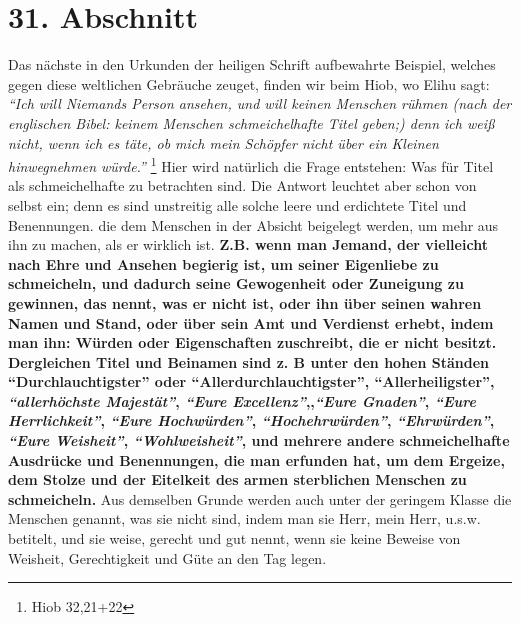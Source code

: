 \section{31. Abschnitt} \label{kap9_ab31}

Das nächste in den Urkunden der heiligen Schrift aufbewahrte Beispiel, welches
gegen diese weltlichen Gebräuche zeuget, finden wir beim Hiob, wo
Elihu sagt:
\textit{"`Ich will Niemands Person ansehen, und will keinen Menschen rühmen
(nach der
englischen Bibel: keinem Menschen schmeichelhafte Titel geben;) denn ich weiß
nicht, wenn ich es täte, ob mich mein Schöpfer nicht über ein Kleinen
hinwegnehmen würde."'}
\footnote{Hiob 32,21+22}
Hier wird natürlich die Frage
entstehen: Was für Titel als schmeichelhafte zu betrachten sind. Die Antwort
leuchtet aber schon von selbst ein; denn es sind unstreitig alle solche leere
und erdichtete Titel und Benennungen. die dem Menschen in der Absicht beigelegt
werden, um mehr aus ihn zu machen, als er wirklich ist. \textbf{Z.B. wenn man
Jemand,
der vielleicht nach Ehre und Ansehen begierig ist, um seiner
Eigenliebe zu
schmeicheln, und dadurch seine Gewogenheit oder Zuneigung zu gewinnen, das
nennt, was er nicht ist, oder ihn über seinen wahren Namen und Stand, oder über
sein Amt und Verdienst erhebt, indem man ihn: Würden oder Eigenschaften
zuschreibt, die er nicht besitzt. Dergleichen Titel und Beinamen sind z. B unter
den hohen Ständen "`Durchlauchtigster"' oder "`Allerdurchlauchtigster"',
"`Allerheiligster"', \textit{"`allerhöchste Majestät"'}, \textit{"`Eure
Excellenz"'},,\textit{"`Eure
Gnaden"'}, \textit{"`Eure Herrlichkeit"'}, \textit{"`Eure Hochwürden"'},
\textit{"`Hochehrwürden"'},
\textit{"`Ehrwürden"'}, \textit{"`Eure Weisheit"'}, \textit{"`Wohlweisheit"'},
und mehrere andere
schmeichelhafte Ausdrücke und Benennungen, die man erfunden hat, um dem Ergeize,
dem Stolze und der Eitelkeit des armen sterblichen Menschen zu schmeicheln.}
Aus demselben Grunde werden auch unter der geringem Klasse die Menschen
genannt, was sie nicht sind, indem man sie Herr, mein Herr, u.s.w. betitelt,
und sie weise, gerecht und gut nennt, wenn sie keine Beweise von Weisheit,
Gerechtigkeit und Güte an den Tag legen.

\medskip

